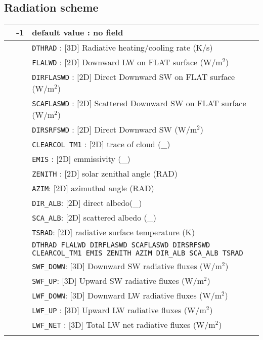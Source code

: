 \subsection{Radiation scheme}
\begin{center}
\begin{tabular}{|>{\centering}p{3cm}|>{\centering}p{2.5cm}|p{11cm}|}
 \hline
\multirow{47}{*}{NRAD\_3D}\label{nrad3d}\index{NRAD\_3D!\innam{NAM\_DIAG}} & {\bf -1} & default value : no field\\\cline{2-3}
&\multirow{12}{*}{0} & {\tt DTHRAD} : [3D] Radiative heating/cooling rate (K/s) \\\cline{3-3}
& &{\tt FLALWD} : [2D] Downward LW on FLAT surface  (W/m$^2$) \\\cline{3-3}
& &{\tt DIRFLASWD} : [2D] Direct Downward SW on FLAT surface  (W/m$^2$) \\\cline{3-3}
& &{\tt SCAFLASWD} : [2D] Scattered Downward SW on FLAT surface (W/m$^2$) \\\cline{3-3}
& &{\tt DIRSRFSWD} : [2D] Direct Downward SW  (W/m$^2$) \\\cline{3-3}
& & {\tt CLEARCOL\_TM1} : [2D] trace of cloud (\_)\\\cline{3-3}
& & {\tt  EMIS} : [2D] emmissivity (\_)\\\cline{3-3}
& & {\tt ZENITH} : [2D] solar zenithal angle (RAD)\\\cline{3-3}
& & {\tt AZIM}: [2D]  azimuthal angle (RAD)\\\cline{3-3}
& & {\tt DIR\_ALB}: [2D] direct albedo(\_)\\\cline{3-3}
& & {\tt SCA\_ALB}: [2D]  scattered albedo (\_)\\\cline{3-3}
& & {\tt TSRAD}: [2D] radiative surface temperature (K)\\\cline{2-3}
&\multirow{12}{*}{1} & {\tt DTHRAD FLALWD DIRFLASWD SCAFLASWD DIRSRFSWD CLEARCOL\_TM1 EMIS ZENITH AZIM DIR\_ALB SCA\_ALB TSRAD}\\\cline{3-3}
& & {\tt SWF\_DOWN}: [3D] Downward SW radiative fluxes (W/m$^2$)\\\cline{3-3}
& & {\tt SWF\_UP}: [3D] Upward SW radiative fluxes (W/m$^2$)\\\cline{3-3}
& & {\tt LWF\_DOWN}: [3D] Downward LW  radiative fluxes (W/m$^2$)\\\cline{3-3}
& & {\tt LWF\_UP} : [3D] Upward LW  radiative fluxes (W/m$^2$)\\\cline{3-3}
& & {\tt LWF\_NET} : [3D] Total LW net radiative fluxes (W/m$^2$)\\\cline{3-3}

\end{tabular}
\end{center}
